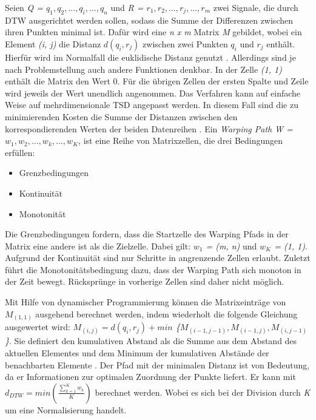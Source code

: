 Seien \emph{Q = $q_{1}, q_{2}, ... , q_{i}, ... , q_{n}$} und \emph{R = $r_{1}, r_{2}, ... , r_{j}, ... , r_{m}$}
zwei Signale, die durch \ac{DTW} ausgerichtet werden sollen, sodass die Summe der Differenzen zwischen ihren Punkten minimal ist.
Dafür wird eine \emph{n x m} Matrix \emph{M} gebildet, wobei ein Element \emph{(i, j)} die Distanz \emph{$d(q_{i}, r_{j})$}
zwischen zwei Punkten \emph{$q_{i}$} und \emph{$r_{j}$} enthält.
Hierfür wird im Normalfall die euklidische Distanz genutzt \citep{warren_liao_clustering_2005}.
Allerdings sind je nach Problemstellung auch andere Funktionen denkbar.
In der Zelle \emph{(1, 1)} enthält die Matrix den Wert 0.
Für die übrigen Zellen der ersten Spalte und Zeile wird jeweils der Wert {\glqq unendlich\grqq} angenommen.
Das Verfahren kann auf einfache Weise auf mehrdimensionale \ac{TSD} angepasst werden.
In diesem Fall sind die zu minimierenden Kosten die Summe
der Distanzen zwischen den korrespondierenden Werten der beiden Datenreihen \citep{mohammadzade_dynamic_2021}.
Ein \emph{Warping Path} \emph{W = $w_{1}, w_{2}, ... , w_{k}, ... , w_{K}$},
ist eine Reihe von Matrixzellen, die drei Bedingungen erfüllen:
\begin{itemize}
    \item Grenzbedingungen
    \item Kontinuität
    \item Monotonität
\end{itemize}
Die Grenzbedingungen fordern, dass die Startzelle des Warping Pfads in der Matrix eine andere ist als die Zielzelle.
Dabei gilt: \emph{$w_{1}$ = (m, n)} und \emph{$w_{K}$ = (1, 1)}.
Aufgrund der Kontinuität sind nur Schritte in angrenzende Zellen erlaubt.
Zuletzt führt die Monotonitätsbedingung dazu, dass der Warping Path sich monoton in der Zeit bewegt.
Rücksprünge in vorherige Zellen sind daher nicht möglich.

Mit Hilfe von dynamischer Programmierung können die Matrixeinträge von \emph{$M_{(1, 1)}$} ausgehend berechnet werden,
indem wiederholt die folgende Gleichung ausgewertet wird:
\emph{$ M_{(i, j)} = d(q_{i}, r_{j}) + min $ \{$M_{(i - 1, j - 1)}, M_{(i - 1, j)}, M_{(i, j - 1)} $\}}.
Sie definiert den kumulativen Abstand als die Summe aus dem Abstand des aktuellen Elementes
und dem Minimum der kumulativen Abstände der benachbarten Elemente \citep{warren_liao_clustering_2005}.
Der Pfad mit der minimalen Distanz ist von Bedeutung,
da er Informationen zur optimalen Zuordnung der Punkte liefert.
Er kann mit \emph{$d_{DTW} = min(\frac{\sum_{k = 1}^{K}w_{k}}{K})$} berechnet werden.
Wobei es sich bei der Division durch \emph{K} um eine Normalisierung handelt.


